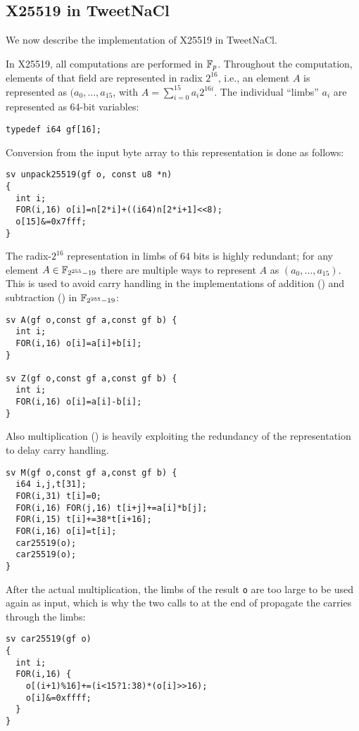 \subsection{X25519 in TweetNaCl}
\label{subsec:X25519-TweetNaCl}

We now describe the implementation of X25519 in TweetNaCl.

In X25519, all computations are performed in $\mathbb{F}_{p}$.
Throughout the computation, elements of that field
are represented in radix $2^{16}$,
i.e., an element $A$ is represented as $(a_0,\dots,a_{15}$,
with $A = \sum_{i=0}^{15}a_i2^{16i}$.
The individual ``limbs'' $a_i$ are represented as
64-bit  variables:
\begin{lstlisting}[language=Ctweetnacl]
typedef i64 gf[16];
\end{lstlisting}

Conversion from the input byte array to this representation is done
as follows:
\begin{lstlisting}[language=Ctweetnacl]
sv unpack25519(gf o, const u8 *n)
{
  int i;
  FOR(i,16) o[i]=n[2*i]+((i64)n[2*i+1]<<8);
  o[15]&=0x7fff;
}
\end{lstlisting}

The radix-$2^{16}$ representation in limbs of $64$ bits is
highly redundant; for any element $A \in \mathbb{F}_{2^{255}-19}$ there are
multiple ways to represent $A$ as $(a_0,\dots,a_{15})$.
This is used to avoid carry handling in the implementations of addition
() and subtraction () in $\mathbb{F}_{2^{255}-19}$:
\begin{lstlisting}[language=Ctweetnacl]
sv A(gf o,const gf a,const gf b) {
  int i;
  FOR(i,16) o[i]=a[i]+b[i];
}

sv Z(gf o,const gf a,const gf b) {
  int i;
  FOR(i,16) o[i]=a[i]-b[i];
}
\end{lstlisting}

Also multiplication () is heavily exploiting the redundancy
of the representation to delay carry handling.
\begin{lstlisting}[language=Ctweetnacl]
sv M(gf o,const gf a,const gf b) {
  i64 i,j,t[31];
  FOR(i,31) t[i]=0;
  FOR(i,16) FOR(j,16) t[i+j]+=a[i]*b[j];
  FOR(i,15) t[i]+=38*t[i+16];
  FOR(i,16) o[i]=t[i];
  car25519(o);
  car25519(o);
}
\end{lstlisting}

After the actual multiplication, the limbs of the result \texttt{o} are
too large to be used again as input, which is why the two calls to
 at the end of  propagate the carries through the limbs:
\begin{lstlisting}[language=Ctweetnacl]
sv car25519(gf o)
{
  int i;
  FOR(i,16) {
    o[(i+1)%16]+=(i<15?1:38)*(o[i]>>16);
    o[i]&=0xffff;
  }
}
\end{lstlisting}


